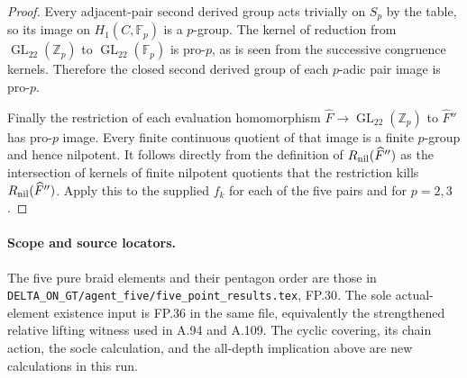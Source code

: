 \begin{proof}
Every adjacent-pair second derived group acts trivially on $S_p$ by
the table, so its image on $H_1(C,\mathbb F_p)$ is a $p$-group.
The kernel of reduction from $\operatorname{GL}_{22}(\mathbb Z_p)$
to $\operatorname{GL}_{22}(\mathbb F_p)$ is pro-$p$, as is seen from
the successive congruence kernels. Therefore the closed second
derived group of each $p$-adic pair image is pro-$p$.

Finally the restriction of each evaluation homomorphism
$\widehat F\to\operatorname{GL}_{22}(\mathbb Z_p)$ to
$\widehat F''$ has pro-$p$ image. Every finite continuous quotient
of that image is a finite $p$-group and hence nilpotent. It follows
directly from the definition of $R_{\rm nil}(\widehat F'')$ as the
intersection of kernels of finite nilpotent quotients that the
restriction kills $R_{\rm nil}(\widehat F'')$. Apply this to the
supplied $f_k$ for each of the five pairs and for $p=2,3$.
\end{proof}

\paragraph{Scope and source locators.}
The five pure braid elements and their pentagon order are those in
\texttt{DELTA\_ON\_GT/agent\_five/five\_point\_results.tex},
\textup{FP.30}. The sole actual-element existence input is
\textup{FP.36} in the same file, equivalently the strengthened
relative lifting witness used in \textup{A.94} and \textup{A.109}.
The cyclic covering, its chain action, the socle calculation, and the
all-depth implication above are new calculations in this run.

